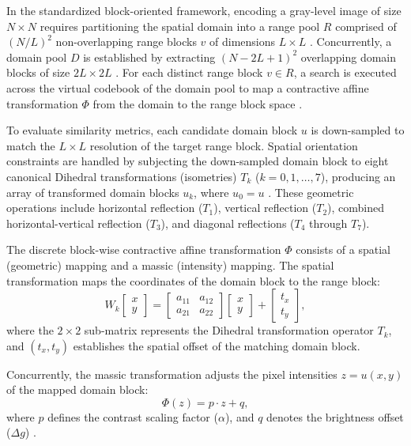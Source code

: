 \documentclass[conference]{IEEEtran}
\begin{document}
In the standardized block-oriented framework, encoding a gray-level image of size $N \times N$ requires partitioning the spatial domain into a range pool $R$ comprised of $(N/L)^2$ non-overlapping range blocks $v$ of dimensions $L \times L$ \cite{FICOriginal}. Concurrently, a domain pool $D$ is established by extracting $(N - 2L + 1)^2$ overlapping domain blocks of size $2L \times 2L$ \cite{FICOriginal}. For each distinct range block $v \in R$, a search is executed across the virtual codebook of the domain pool to map a contractive affine transformation $\Phi$ from the domain to the range block space \cite{FICOriginal}.

To evaluate similarity metrics, each candidate domain block $u$ is down-sampled to match the $L \times L$ resolution of the target range block. Spatial orientation constraints are handled by subjecting the down-sampled domain block to eight canonical Dihedral transformations (isometries) $T_k$ ($k = 0, 1, \dots, 7$), producing an array of transformed domain blocks $u_k$, where $u_0 = u$ \cite{FICOriginal}. These geometric operations include horizontal reflection ($T_1$), vertical reflection ($T_2$), combined horizontal-vertical reflection ($T_3$), and diagonal reflections ($T_4$ through $T_7$).

The discrete block-wise contractive affine transformation $\Phi$ consists of a spatial (geometric) mapping and a massic (intensity) mapping. The spatial transformation maps the coordinates of the domain block to the range block:
\begin{equation}
W_k \begin{bmatrix} x \\ y \end{bmatrix} = \begin{bmatrix} a_{11} & a_{12} \\ a_{21} & a_{22} \end{bmatrix} \begin{bmatrix} x \\ y \end{bmatrix} + \begin{bmatrix} t_x \\ t_y \end{bmatrix},
\end{equation}
where the $2 \times 2$ sub-matrix represents the Dihedral transformation operator $T_k$, and $(t_x, t_y)$ establishes the spatial offset of the matching domain block. 

Concurrently, the massic transformation adjusts the pixel intensities $z = u(x,y)$ of the mapped domain block:
\begin{equation}
\Phi(z) = p \cdot z + q,
\end{equation}
where $p$ defines the contrast scaling factor ($\alpha$), and $q$ denotes the brightness offset ($\Delta g$) \cite{FICOriginal}.
\end{document}
